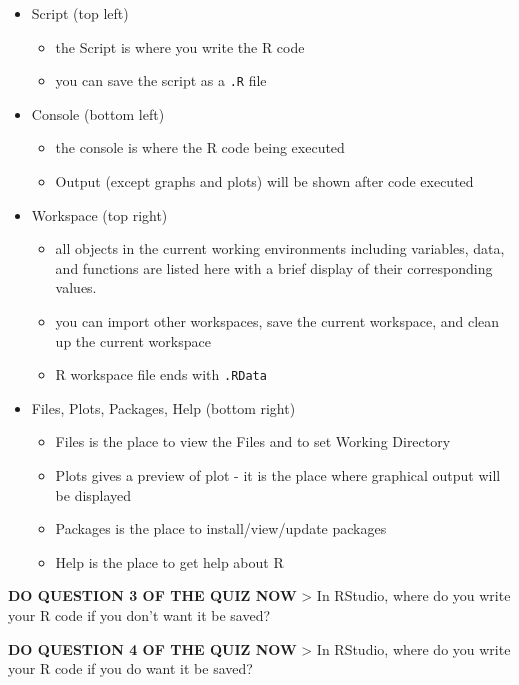 \documentclass[
]{book}
\begin{document}
\begin{itemize}
\item
  Script (top left)

  \begin{itemize}
  \item
    the Script is where you write the R code
  \item
    you can save the script as a \texttt{.R} file
  \end{itemize}
\item
  Console (bottom left)

  \begin{itemize}
  \item
    the console is where the R code being executed
  \item
    Output (except graphs and plots) will be shown after code executed
  \end{itemize}
\item
  Workspace (top right)

  \begin{itemize}
  \item
    all objects in the current working environments including variables, data, and functions are listed here with a brief display of their corresponding values.
  \item
    you can import other workspaces, save the current workspace, and clean up the current workspace
  \item
    R workspace file ends with \texttt{.RData}
  \end{itemize}
\item
  Files, Plots, Packages, Help (bottom right)

  \begin{itemize}
  \item
    Files is the place to view the Files and to set Working Directory
  \item
    Plots gives a preview of plot - it is the place where graphical output will be displayed
  \item
    Packages is the place to install/view/update packages
  \item
    Help is the place to get help about R
  \end{itemize}
\end{itemize}

\textbf{DO QUESTION 3 OF THE QUIZ NOW}
\textgreater{} In RStudio, where do you write your R code if you don't want it be saved?

\textbf{DO QUESTION 4 OF THE QUIZ NOW}
\textgreater{} In RStudio, where do you write your R code if you do want it be saved?
\end{document}
